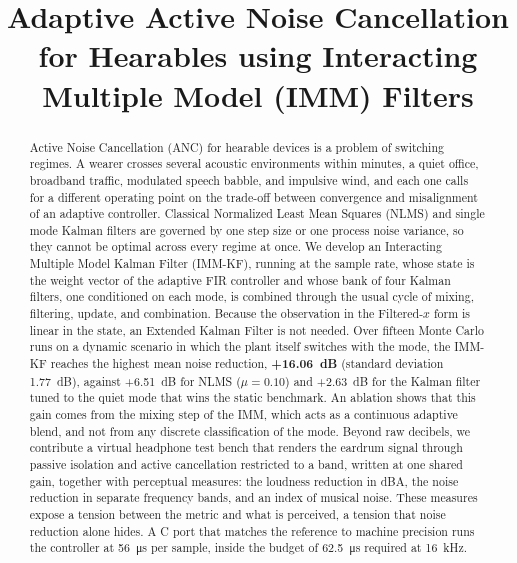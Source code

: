 \documentclass[conference]{IEEEtran}
\begin{document}
\title{Adaptive Active Noise Cancellation for Hearables using Interacting Multiple Model (IMM) Filters}

\author{%
}

\maketitle

\begin{abstract}
Active Noise Cancellation (ANC) for hearable devices is a problem of switching
regimes. A wearer crosses several acoustic environments within minutes, a quiet
office, broadband traffic, modulated speech babble, and impulsive wind, and each
one calls for a different operating point on the trade-off between convergence and
misalignment of an adaptive controller. Classical Normalized Least Mean Squares
(NLMS) and single mode Kalman filters are governed by one step size or one process
noise variance, so they cannot be optimal across every regime at once. We develop
an Interacting Multiple Model Kalman Filter (IMM-KF), running at the sample rate,
whose state is the weight vector of the adaptive FIR controller and whose bank of
four Kalman filters, one conditioned on each mode, is combined through the usual
cycle of mixing, filtering, update, and combination. Because the observation in the
Filtered-$x$ form is linear in the state, an Extended Kalman Filter is not needed.
Over fifteen Monte Carlo runs on a dynamic scenario in which the plant itself
switches with the mode, the IMM-KF reaches the highest mean noise reduction,
\textbf{+16.06~dB} (standard deviation 1.77~dB), against +6.51~dB for NLMS
($\mu=0.10$) and +2.63~dB for the Kalman filter tuned to the quiet mode that wins
the static benchmark. An ablation shows that this gain comes from the mixing step
of the IMM, which acts as a continuous adaptive blend, and not from any discrete
classification of the mode. Beyond raw decibels, we contribute a virtual headphone
test bench that renders the eardrum signal through passive isolation and active
cancellation restricted to a band, written at one shared gain, together with
perceptual measures: the loudness reduction in dBA, the noise reduction in separate
frequency bands, and an index of musical noise. These measures expose a tension
between the metric and what is perceived, a tension that noise reduction alone
hides. A C port that matches the reference to machine precision runs the controller
at \SI{56}{\micro\second} per sample, inside the budget of \SI{62.5}{\micro\second}
required at \SI{16}{\kilo\hertz}.
\end{abstract}
\end{document}
